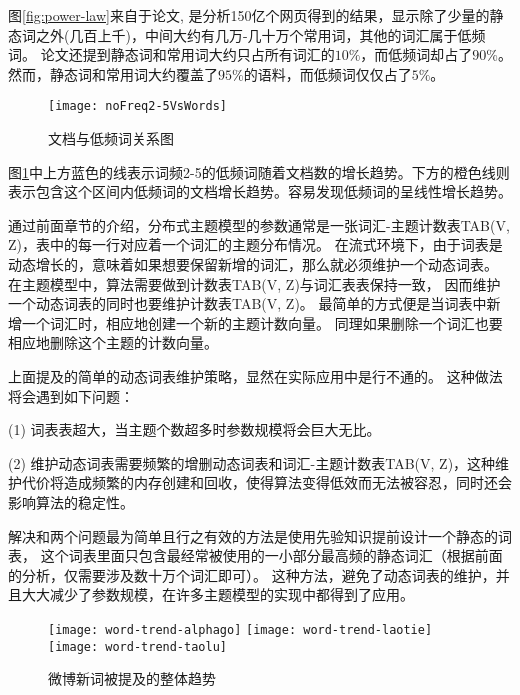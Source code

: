 图\ref{fig:power-law}来自于论文\cite{yuan2015lightlda}, 是分析150亿个网页得到的结果，显示除了少量的静态词之外(几百上千)，中间大约有几万-几十万个常用词，其他的词汇属于低频词。
论文\cite{yuan2015lightlda}还提到静态词和常用词大约只占所有词汇的$10\%$，而低频词却占了$90\%$。然而，静态词和常用词大约覆盖了$95\%$的语料，而低频词仅仅占了$5\%$。

\begin{figure}[htb]\centering
\texttt{[image: noFreq2-5VsWords]}
\caption{文档与低频词关系图}
\label{fig:noFreq2-5VsWords}       %
\end{figure}

图\ref{fig:noFreq2-5VsWords}中上方蓝色的线表示词频2-5的低频词随着文档数的增长趋势。下方的橙色线则表示包含这个区间内低频词的文档增长趋势。容易发现低频词的呈线性增长趋势。

通过前面章节的介绍，分布式主题模型的参数通常是一张词汇-主题计数表TAB(V, Z)，表中的每一行对应着一个词汇的主题分布情况。
在流式环境下，由于词表是动态增长的，意味着如果想要保留新增的词汇，那么就必须维护一个动态词表。
在主题模型中，算法需要做到计数表TAB(V, Z)与词汇表表保持一致，
因而维护一个动态词表的同时也要维护计数表TAB(V, Z)。
最简单的方式便是当词表中新增一个词汇时，相应地创建一个新的主题计数向量。
同理如果删除一个词汇也要相应地删除这个主题的计数向量。

上面提及的简单的动态词表维护策略，显然在实际应用中是行不通的。
这种做法将会遇到如下问题：

(1) 词表表超大，当主题个数超多时参数规模将会巨大无比。

(2) 维护动态词表需要频繁的增删动态词表和词汇-主题计数表TAB(V, Z)，这种维护代价将造成频繁的内存创建和回收，使得算法变得低效而无法被容忍，同时还会影响算法的稳定性。

解决和两个问题最为简单且行之有效的方法是使用先验知识提前设计一个静态的词表，
这个词表里面只包含最经常被使用的一小部分最高频的静态词汇（根据前面的分析，仅需要涉及数十万个词汇即可）。
这种方法，避免了动态词表的维护，并且大大减少了参数规模，在许多主题模型的实现中都得到了应用。

\begin{figure}[htb]\centering
\texttt{[image: word-trend-alphago]}
\texttt{[image: word-trend-laotie]}
\texttt{[image: word-trend-taolu]}
\caption{微博新词被提及的整体趋势}
\label{fig:new-word-trend}       %
\end{figure}

